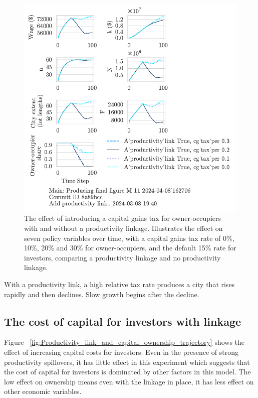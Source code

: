 \begin{figure}[h!tb]
    \includegraphics[scale=.75, trim={0 1.4cm 3.5cm 0},clip]{fig/link-cg_tax_per-4_162706.pdf}%
    \caption[The effect of introducing a capital gains tax for owner-occupiers with and without a productivity linkage]{The effect of introducing a capital gains tax for owner-occupiers with and without a productivity linkage. Illustrates the effect on seven policy variables over time, with a capital gains tax rate of 0\%, 10\%, 20\% and 30\% for owner-occupiers, and the default 15\% rate for investors, comparing a productivity linkage and no productivity linkage.}
    \label{fig:CG-pers_link_W-WO-Cost-of-capital}
\end{figure}

With a productivity link, a high relative tax rate produces a city that rises rapidly and then declines. Slow growth begins after the decline.





\newpage
\subsection{The cost of capital for investors  with linkage}
Figure ~\ref{fig:Productivity_link_and_capital_ownership_trajectory} shows the effect of increasing capital costs for investors. Even in the presence of strong productivity spillovers, it has little effect in this experiment which suggests that the cost of capital for investors is dominated by other factors in this model. The low effect on ownership means even with the linkage in place, it has less effect on other economic variables. 


